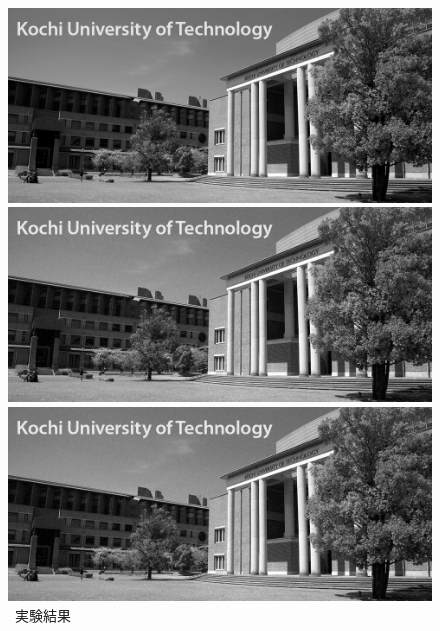 \begin{figure}[h]
    \centering
    \begin{minipage}[b]{.3\textwidth}
        \centering
        \includegraphics[keepaspectratio,width=\textwidth]{../../Figures/05_21_gimg.png}
    \end{minipage}
    \begin{minipage}[b]{.3\textwidth}
        \centering
        \includegraphics[keepaspectratio,width=\textwidth]{../../06_ImageFiltering/file_white-Gaussian-Noise.png}
    \end{minipage}
    \begin{minipage}[b]{.3\textwidth}
        \centering
        \includegraphics[keepaspectratio,width=\textwidth]{../../06_ImageFiltering/file_impluse-noise.png}
    \end{minipage}
    \caption{\kadaiaa\ 実験結果}
\end{figure}
